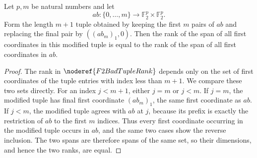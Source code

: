 \begin{helper}
Let \(p,m\) be natural numbers and let
\[
  ab:\{0,\ldots,m\}\to \mathbb F_2^p\times\mathbb F_2^p.
\]
Form the length \(m+1\) tuple obtained by keeping the first \(m\) pairs of
\(ab\) and replacing the final pair by \(((ab_m)_1,0)\). Then the rank of the
span of all first coordinates in this modified tuple is equal to the rank of
the span of all first coordinates in \(ab\).
\end{helper}
\begin{proof}
The rank in \(\noderef{F2BadTupleRank}\) depends only on the set of first
coordinates of the tuple entries with index less than \(m+1\). We compare
these two sets directly. For an index \(j<m+1\), either \(j=m\) or \(j<m\).
If \(j=m\), the modified tuple has final first coordinate \((ab_m)_1\), the
same first coordinate as \(ab\). If \(j<m\), the modified tuple agrees with
\(ab\) at \(j\), because its prefix is exactly the restriction of \(ab\) to
the first \(m\) indices. Thus every first coordinate occurring in the modified
tuple occurs in \(ab\), and the same two cases show the reverse inclusion.
The two spans are therefore spans of the same set, so their dimensions, and
hence the two ranks, are equal.
\end{proof}

